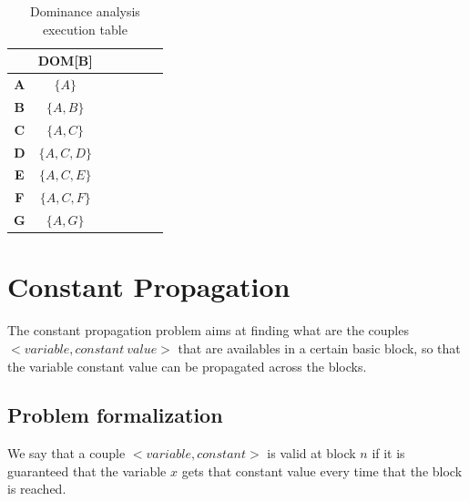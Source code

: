 \documentclass{article}
\begin{document}
\begin{table}[H]
	\centering
	\begin{tabular}{|c|c|c|c|c|c|c|}
		\hline
		           & \textbf{DOM[B]} \\ \hline
		\textbf{A} & $\{A\}$         \\ \hline
		\textbf{B} & $\{A, B\}$      \\ \hline
		\textbf{C} & $\{A, C\}$      \\ \hline
		\textbf{D} & $\{A, C, D\}$   \\ \hline
		\textbf{E} & $\{A, C, E\}$   \\ \hline
		\textbf{F} & $\{A, C, F\}$   \\ \hline
		\textbf{G} & $\{A, G\}$      \\ \hline
	\end{tabular}
	\caption{Dominance analysis execution table}
\end{table}

\section{Constant Propagation}

The constant propagation problem aims at finding what are the couples $<variable, constant \ value>$ that are availables in a certain basic block, so that the variable constant value can be propagated across the blocks.

\subsection{Problem formalization}

We say that a couple $<variable, constant>$ is valid at block $n$ if it is guaranteed that the variable $x$ gets that constant value every time that the block is reached.
\end{document}
